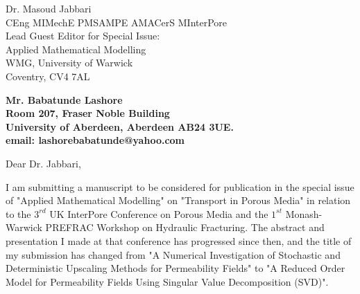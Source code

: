 \documentclass[11pt]{letter} %
\begin{document}

\begin{letter}{Dr. Masoud Jabbari \\
CEng MIMechE PMSAMPE AMACerS MInterPore \\
Lead Guest Editor for Special Issue: \\
Applied Mathematical Modelling \\
WMG, University of Warwick \\
Coventry, CV4 7AL}





\begin{center}
\large\bf Mr. Babatunde Lashore \\ %
Room 207, Fraser Noble Building \\ University of Aberdeen, Aberdeen AB24 3UE. \\ email: lashorebabatunde@yahoo.com %
\end{center} 
\vfill

\signature{B. Lashore} %


\opening{Dear Dr. Jabbari,} 
 
I am submitting a manuscript to be considered for publication in the special issue of "Applied Mathematical Modelling" on "Transport in Porous Media" in relation to the $3^{rd}$ UK InterPore Conference on Porous Media and the $1^{st}$ Monash-Warwick PREFRAC Workshop on Hydraulic Fracturing. The abstract and presentation I made at that conference has progressed since then, and the title of my submission has changed from "A Numerical Investigation of Stochastic and Deterministic Upscaling Methods for Permeability Fields" to "A Reduced Order Model for Permeability Fields Using Singular Value Decomposition (SVD)".
 


\end{letter}
\end{document}
